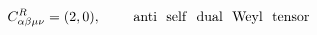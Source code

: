 \begin{equation}
C^{R}_{\alpha \beta \mu \nu} =(2,0),~~~~~~~ {\rm anti~~ self~~ dual~~ Weyl~~ tensor}
\end{equation}

